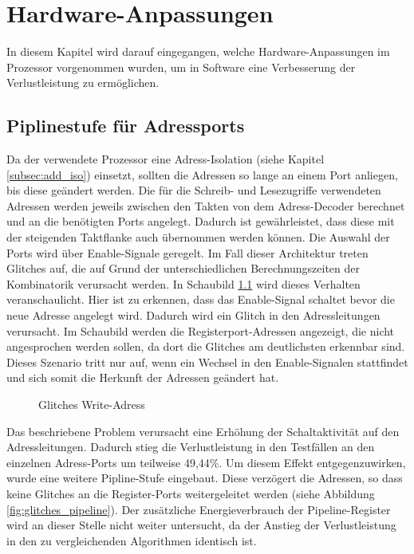 \chapter{Hardware-Anpassungen}
In diesem Kapitel wird darauf eingegangen, welche Hardware-Anpassungen im Prozessor vorgenommen wurden, um in Software eine Verbesserung der Verlustleistung zu ermöglichen.
\section{Piplinestufe für Adressports}
Da der verwendete Prozessor eine Adress-Isolation (siehe Kapitel \ref{subsec:add_iso}) einsetzt, sollten die Adressen so lange an einem Port anliegen, bis diese geändert werden.
Die für die Schreib- und Lesezugriffe verwendeten Adressen werden jeweils zwischen den Takten von dem Adress-Decoder berechnet und an die benötigten Ports angelegt. Dadurch ist gewährleistet, dass diese mit der steigenden Taktflanke auch übernommen werden können. Die Auswahl der Ports wird über Enable-Signale geregelt. Im Fall dieser Architektur treten Glitches auf, die auf Grund der unterschiedlichen Berechnungszeiten der Kombinatorik verursacht werden. In Schaubild \ref{fig:glitches} wird dieses Verhalten veranschaulicht. Hier ist zu erkennen, dass das Enable-Signal schaltet bevor die neue Adresse angelegt wird. Dadurch wird ein Glitch in den Adressleitungen verursacht. Im Schaubild werden die Registerport-Adressen angezeigt, die nicht angesprochen werden sollen, da dort die Glitches am deutlichsten erkennbar sind. Dieses Szenario tritt nur auf, wenn ein Wechsel in den Enable-Signalen stattfindet und sich somit die Herkunft der Adressen geändert hat.

\begin{figure}[H] 
	\centering
	
	\caption{Glitches Write-Adress}
	\label{fig:glitches}
\end{figure}


Das beschriebene Problem verursacht eine Erhöhung der Schaltaktivität auf den Adressleitungen. Dadurch stieg die Verlustleistung in den Testfällen an den einzelnen Adress-Ports um teilweise 49,44\%.
Um diesem Effekt entgegenzuwirken, wurde eine weitere Pipline-Stufe eingebaut. Diese verzögert die Adressen, so dass keine Glitches an die Register-Ports weitergeleitet werden (siehe Abbildung \ref{fig:glitches_pipeline}). Der zusätzliche Energieverbrauch der Pipeline-Register wird an dieser Stelle nicht weiter untersucht, da der Anstieg der Verlustleistung in den zu vergleichenden Algorithmen identisch ist.

